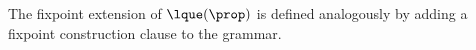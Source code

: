 %	
%

The fixpoint extension of $\lque(\prop)$ is defined analogously by adding a fixpoint construction clause to the grammar.

